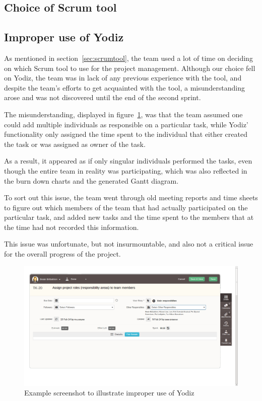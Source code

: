
\subsection{Choice of Scrum tool}

\subsection{Improper use of Yodiz}
\label{sec:improperScrum}
As mentioned in section~\ref{sec:scrumtool}, the team used a lot of time on
deciding on which Scrum tool to use for the project management. Although our
choice fell on Yodiz, the team was in lack of any previous experience with the
tool, and despite the team's efforts to get acquainted with the tool, a
misunderstanding arose and was not discovered until the end of the second
sprint.

The misunderstanding, displayed in figure~\ref{fig:wrongUse}, was that the team
assumed one could add multiple individuals as responsible on a particular task,
while Yodiz' functionality only assigned the time spent to the individual that
either created the task or was assigned as owner of the task.

As a result, it appeared as if only singular individuals performed the tasks,
even though the entire team in reality was participating, which was also
reflected in the burn down charts and the generated Gantt diagram. 

To sort out this issue, the team went through old meeting reports and time sheets
to figure out which members of the team that had actually participated on the
particular task, and added new tasks and the time spent to the members that at
the time had not recorded this information.%

This issue was unfortunate, but not insurmountable, and also not a critical
issue for the overall progress of the project.

\begin{figure}[H]
\includegraphics[width=\textwidth, clip, trim=1cm 2cm 4cm 1cm]{ch/retrospect/fig/wrongUse.png}
\caption{Example screenshot to illustrate improper use of Yodiz}
\label{fig:wrongUse}
\end{figure}